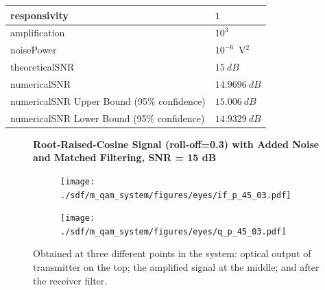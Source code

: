 \begin{refsection}
\begin{table}[H]
\begin{tabular}{|l|l|}
		responsivity           & $1$                                                        \\ \hline
		amplification          & $10^3$                                                     \\ \hline
		noisePower   & $10^{-6}$~V$^2$                             					\\ \hline
		theoreticalSNR  	   & $15~dB$                             					\\ \hline
		numericalSNR 		     & $14.9696~dB$                             					\\ \hline
		numericalSNR Upper Bound (95\% confidence) & $15.006~dB$                             					\\ \hline
		numericalSNR Lower Bound (95\% confidence) & $14.9329~dB$                             					\\ \hline
	\end{tabular}
\end{table}
\begin{figure}[H]
		\centering
	\textbf{Root-Raised-Cosine Signal (roll-off=0.3) with Added Noise and Matched Filtering, SNR = 15 dB}
	\begin{minipage}{\linewidth}
		\centering
	\begin{subfigure}{.45\textwidth}
		\centering
		\texttt{[image: ./sdf/m\_qam\_system/figures/eyes/if\_p\_45\_03.pdf]}
	\end{subfigure}
	\begin{subfigure}{.45\textwidth}
		\centering
		\texttt{[image: ./sdf/m\_qam\_system/figures/eyes/q\_p\_45\_03.pdf]}
	\end{subfigure}
	
	\caption{
		Obtained at three different points in the system: optical output of transmitter on the top;
		the amplified signal at the middle; and
		after the receiver filter.
		\label{fig:eyes_n_rrc_45_03}}
	\end{minipage}
\end{figure}




\end{refsection}
